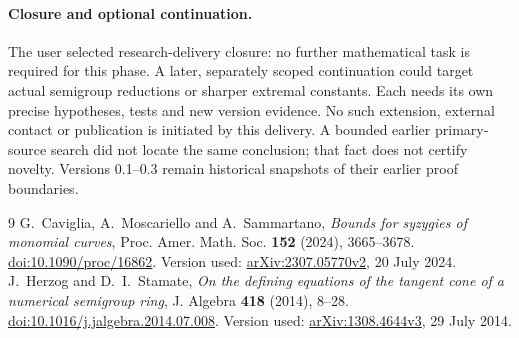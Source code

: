 \documentclass[11pt,a4paper]{article}
\begin{document}
\paragraph{Closure and optional continuation.}
The user selected research-delivery closure: no further mathematical task is
required for this phase. A later, separately scoped continuation could target
actual semigroup reductions or sharper extremal constants.
Each needs its own precise hypotheses, tests and new version evidence.
No such extension, external contact or publication is initiated by this delivery.
A bounded earlier primary-source search did not locate the same conclusion;
that fact does not certify novelty. Versions 0.1--0.3 remain historical
snapshots of their earlier proof boundaries.

\begin{thebibliography}{9}
 G.~Caviglia, A.~Moscariello and A.~Sammartano,
\emph{Bounds for syzygies of monomial curves},
Proc. Amer. Math. Soc. \textbf{152} (2024), 3665--3678.
\href{https://doi.org/10.1090/proc/16862}{doi:10.1090/proc/16862}.
Version used: \href{https://arxiv.org/abs/2307.05770v2}{arXiv:2307.05770v2}, 20 July 2024.
 J.~Herzog and D.~I.~Stamate,
\emph{On the defining equations of the tangent cone of a numerical semigroup ring},
J. Algebra \textbf{418} (2014), 8--28.
\href{https://doi.org/10.1016/j.jalgebra.2014.07.008}{doi:10.1016/j.jalgebra.2014.07.008}.
Version used: \href{https://arxiv.org/abs/1308.4644v3}{arXiv:1308.4644v3}, 29 July 2014.
\end{thebibliography}
\end{document}

